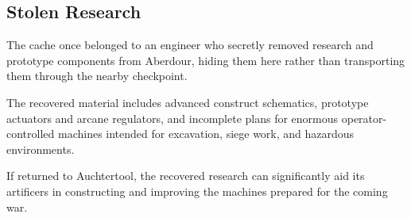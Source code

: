 \subsection*{Stolen Research}
{\entryfont The cache once belonged to an engineer who secretly removed research and prototype components from Aberdour, hiding them here rather than transporting them through the nearby checkpoint.

The recovered material includes advanced construct schematics, prototype actuators and arcane regulators, and incomplete plans for enormous operator-controlled machines intended for excavation, siege work, and hazardous environments.

If returned to Auchtertool, the recovered research can significantly aid its artificers in constructing and improving the machines prepared for the coming war.}